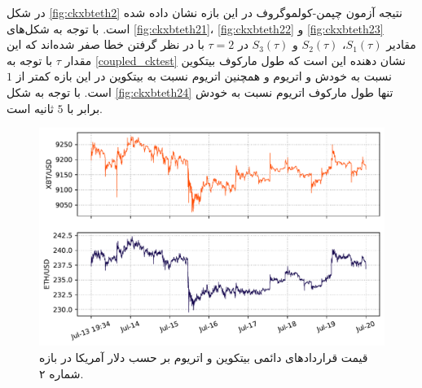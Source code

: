 در شکل \ref{fig:ckxbteth2} نتیجه آزمون چپمن-کولموگروف در این بازه نشان داده شده است. 
با توجه به شکل‌های \ref{fig:ckxbteth21}، \ref{fig:ckxbteth22} و \ref{fig:ckxbteth23} مقادیر $S_1(\tau)$، $S_2(\tau)$ و $S_3(\tau)$ 
در $\tau = 2$ با در نظر گرفتن خطا صفر شده‌اند که این مقدار $\tau$ با توجه به \ref{coupled_cktest} نشان دهنده این است که طول مارکوف بیتکوین نسبت به خودش و 
اتریوم و همچنین اتریوم نسبت به بیتکوین در این بازه کمتر از $1$ است. با توجه به شکل \ref{fig:ckxbteth24} تنها طول مارکوف اتریوم نسبت به 
خودش برابر با $5$ ثانیه است.
\begin{figure}[H]
  \centering
  \includegraphics[width=\textwidth]{images/xbteth2.pdf}
  \caption{قیمت قراردادهای دائمی بیتکوین و اتریوم بر حسب دلار آمریکا در بازه شماره ۲.}\label{fig:XBTETH2}
\end{figure}
